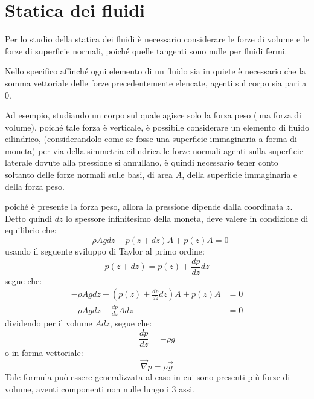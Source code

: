 \documentclass[11pt, a4paper, openright]{book}
\theoremstyle{plain}
\theoremstyle{definition}
\begin{document}
\newpage

\section{Statica dei fluidi}
Per lo studio della statica dei fluidi è necessario considerare le forze di volume e le forze di superficie normali, poiché quelle tangenti sono nulle per fluidi fermi.

Nello specifico affinché ogni elemento di un fluido sia in quiete è necessario che la somma vettoriale delle forze precedentemente elencate, agenti sul corpo sia pari a 0.

Ad esempio, studiando un corpo sul quale agisce solo la forza peso (una forza di volume), poiché tale forza è verticale, è possibile considerare un elemento di fluido cilindrico, (considerandolo come se fosse una superficie immaginaria a forma di moneta) per via della simmetria cilindrica le forze normali agenti sulla superficie laterale dovute alla pressione si annullano, è quindi necessario tener conto soltanto delle forze normali sulle basi, di area $A$, della superficie immaginaria e della forza peso.

poiché è presente la forza peso, allora la pressione dipende dalla coordinata $z$. Detto quindi $dz$ lo spessore infinitesimo della moneta, deve valere in condizione di equilibrio che:
\begin{equation}
    -\rho Agdz -p(z + dz)A + p(z)A = 0 
\end{equation}
usando il seguente sviluppo di Taylor al primo ordine:
\begin{equation}
    p(z + dz) = p(z) + \frac{dp}{dz}dz
\end{equation}
segue che:
\begin{align}
    -\rho Agdz -(p(z) + \frac{dp}{dz}dz)A + p(z)A & = 0 \\
    -\rho Agdz - \frac{dp}{dz}Adz & = 0
\end{align}
dividendo per il volume $Adz$, segue che:
\begin{equation}
    \frac{dp}{dz} = -\rho g
    \label{eq:relazioneDerivataDellaPressione}
\end{equation}
o in forma vettoriale:
\begin{equation}
    \vec{\nabla}p = \rho\vec{g}
\end{equation}
Tale formula può essere generalizzata al caso in cui sono presenti più forze di volume, aventi componenti non nulle lungo i 3 assi.
\end{document}
